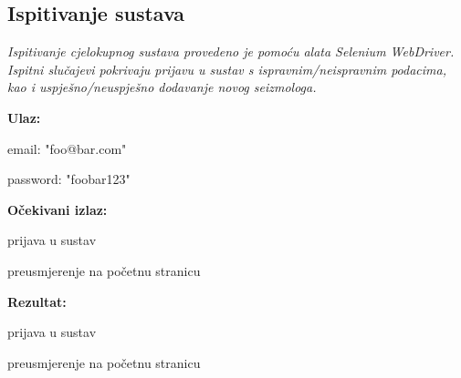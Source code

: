 			\subsection{Ispitivanje sustava}
			
			 \textit{Ispitivanje cjelokupnog sustava provedeno je pomoću alata Selenium WebDriver. Ispitni slučajevi pokrivaju prijavu u sustav s ispravnim/neispravnim podacima, kao i uspješno/neuspješno dodavanje novog seizmologa.\\ }
			 
			 \noindent {}
			 \begin{packed_item}

				 \item \textbf{Ulaz:}

				 \item[] \begin{packed_enum}
					\item email: "foo@bar.com"
					\item password: "foobar123"
				\end{packed_enum}

				  \item \textbf{Očekivani izlaz:}

				 \item[] \begin{packed_enum}
					\item prijava u sustav
					\item preusmjerenje na početnu stranicu
				\end{packed_enum}
				 
				\item \textbf{Rezultat:}

				\item[] \begin{packed_enum}
					\item prijava u sustav
					\item preusmjerenje na početnu stranicu
			   \end{packed_enum}

			 \end{packed_item}
